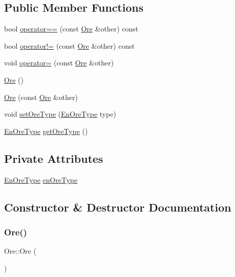 \subsection*{Public Member Functions}
\begin{DoxyCompactItemize}
\item 
bool \mbox{\hyperlink{class_ore_a1264f907e235e2fd60e0c6ba5f7778dd}{operator==}} (const \mbox{\hyperlink{class_ore}{Ore}} \&other) const
\item 
bool \mbox{\hyperlink{class_ore_ac00c9de7ec899518c864199a18b52eac}{operator!=}} (const \mbox{\hyperlink{class_ore}{Ore}} \&other) const
\item 
void \mbox{\hyperlink{class_ore_ab7fc14ea7982fa6a40c8f5408899bfba}{operator=}} (const \mbox{\hyperlink{class_ore}{Ore}} \&other)
\item 
\mbox{\hyperlink{class_ore_a46da77e2af24e80475b393fbbc141357}{Ore}} ()
\item 
\mbox{\hyperlink{class_ore_a06914cddcedb828081b0183a46db6ac5}{Ore}} (const \mbox{\hyperlink{class_ore}{Ore}} \&other)
\item 
void \mbox{\hyperlink{class_ore_a7d463e3c3da27da5a4e645c8ea062251}{set\+Ore\+Type}} (\mbox{\hyperlink{_ore_8hpp_a4dd6f8b19eecee73049dd69be5803f14}{En\+Ore\+Type}} type)
\item 
\mbox{\hyperlink{_ore_8hpp_a4dd6f8b19eecee73049dd69be5803f14}{En\+Ore\+Type}} \mbox{\hyperlink{class_ore_a77e26bca7317ab83d19dbf8695bcebb6}{get\+Ore\+Type}} ()
\end{DoxyCompactItemize}
\subsection*{Private Attributes}
\begin{DoxyCompactItemize}
\item 
\mbox{\hyperlink{_ore_8hpp_a4dd6f8b19eecee73049dd69be5803f14}{En\+Ore\+Type}} \mbox{\hyperlink{class_ore_a834b6f726ecb7ce8e0904fd58f551a16}{en\+Ore\+Type}}
\end{DoxyCompactItemize}


\subsection{Constructor \& Destructor Documentation}
\mbox{\label{class_ore_a46da77e2af24e80475b393fbbc141357}} 
\subsubsection{\texorpdfstring{Ore()}{Ore()}\hspace{0.1cm}{\footnotesize\ttfamily [1/2]}}
{\footnotesize\ttfamily Ore\+::\+Ore (\begin{DoxyParamCaption}{ }\end{DoxyParamCaption})}

